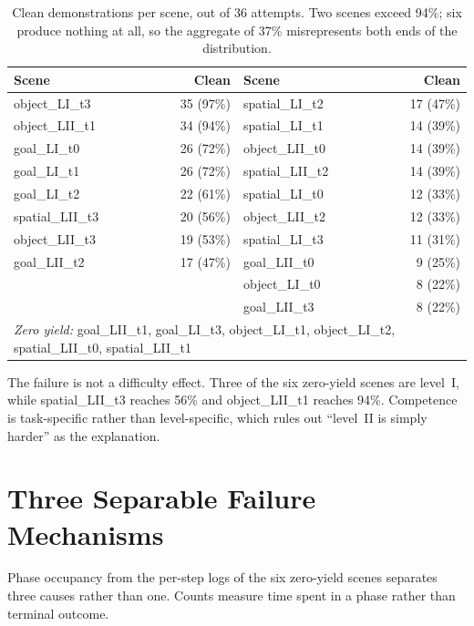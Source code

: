 \documentclass[a4paper,11pt]{report}
\begin{document}
\begin{table}[htbp]
\centering
\caption{Clean demonstrations per scene, out of 36 attempts. Two scenes exceed 94\%; six produce
  nothing at all, so the aggregate of 37\% misrepresents both ends of the distribution.}
\label{tab:planner_yield}
\footnotesize
\begin{tabular}{lrlr}
\toprule
\textbf{Scene} & \textbf{Clean} & \textbf{Scene} & \textbf{Clean} \\
\midrule
object\_LI\_t3    & 35 (97\%) & spatial\_LI\_t2   & 17 (47\%) \\
object\_LII\_t1   & 34 (94\%) & spatial\_LI\_t1   & 14 (39\%) \\
goal\_LI\_t0      & 26 (72\%) & object\_LII\_t0   & 14 (39\%) \\
goal\_LI\_t1      & 26 (72\%) & spatial\_LII\_t2  & 14 (39\%) \\
goal\_LI\_t2      & 22 (61\%) & spatial\_LI\_t0   & 12 (33\%) \\
spatial\_LII\_t3  & 20 (56\%) & object\_LII\_t2   & 12 (33\%) \\
object\_LII\_t3   & 19 (53\%) & spatial\_LI\_t3   & 11 (31\%) \\
goal\_LII\_t2     & 17 (47\%) & goal\_LII\_t0     & \phantom{0}9 (25\%) \\
                  &           & object\_LI\_t0    & \phantom{0}8 (22\%) \\
                  &           & goal\_LII\_t3     & \phantom{0}8 (22\%) \\
\midrule
\multicolumn{4}{l}{\emph{Zero yield:} goal\_LII\_t1, goal\_LI\_t3, object\_LI\_t1,
  object\_LI\_t2, spatial\_LII\_t0, spatial\_LII\_t1} \\
\bottomrule
\end{tabular}
\end{table}

The failure is not a difficulty effect. Three of the six zero-yield scenes are level~I, while
spatial\_LII\_t3 reaches 56\% and object\_LII\_t1 reaches 94\%. Competence is task-specific rather
than level-specific, which rules out ``level~II is simply harder'' as the explanation.

\section{Three Separable Failure Mechanisms}

Phase occupancy from the per-step logs of the six zero-yield scenes separates three causes rather
than one. Counts measure time spent in a phase rather than terminal outcome.
\end{document}

